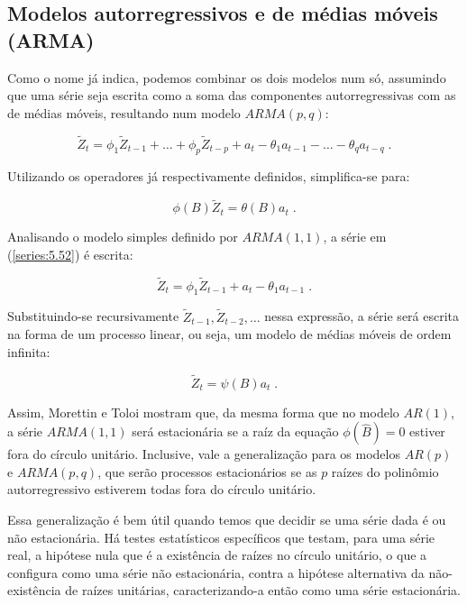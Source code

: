 \subsection{Modelos autorregressivos e de médias móveis (ARMA)}

Como o nome já indica, podemos combinar os dois modelos num só, assumindo que uma série seja escrita como a soma das componentes autorregressivas com as de médias móveis, resultando num modelo $ARMA(p, q)$:

\begin{equation}\label{series:5.52}
\tilde{Z}_t = \phi_1 \tilde{Z}_{t-1} + \ldots + \phi_p \tilde{Z}_{t-p} + a_t - \theta_1 a_{t-1} - \ldots - \theta_q a_{t-q}\;.
\end{equation}

Utilizando os operadores já respectivamente definidos, simplifica-se para:

\begin{equation}\label{series:5.53}
\phi(B)\tilde{Z}_t = \theta(B)a_t\;.
\end{equation}

Analisando o modelo simples definido por $ARMA(1, 1)$, a série em (\ref{series:5.52}) é escrita:

\begin{equation}\label{series:5.54}
\tilde{Z}_t = \phi_1 \tilde{Z}_{t-1} + a_t - \theta_1 a_{t-1}\;.
\end{equation}

Substituindo-se recursivamente $\tilde{Z}_{t-1}, \tilde{Z}_{t-2}, \ldots$ nessa expressão, a série será escrita na forma de um processo linear, ou seja, um modelo de médias móveis de ordem infinita:

\[
\tilde{Z}_t = \psi(B)a_t\;.
\]

Assim, Morettin e Toloi \citep{morettin} mostram que, da mesma forma que no modelo $AR(1)$, a série $ARMA(1,1)$ será estacionária se a raíz da equação $\phi(\hat{B}) = 0$ estiver fora do círculo unitário. Inclusive, vale a generalização para os modelos $AR(p)$ e $ARMA(p,q)$, que serão processos estacionários se as $p$ raízes do polinômio autorregressivo estiverem todas fora do círculo unitário.

Essa generalização é bem útil quando temos que decidir se uma série dada é ou não estacionária. Há testes estatísticos específicos que testam, para uma série real, a hipótese nula que é a existência de raízes no círculo unitário, o que a configura como uma série não estacionária, contra a hipótese alternativa da não-existência de raízes unitárias, caracterizando-a então como uma série estacionária.

